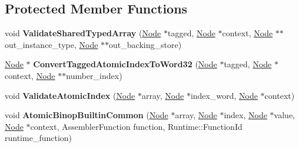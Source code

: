 \subsection*{Protected Member Functions}
\begin{DoxyCompactItemize}
\item 
\mbox{\label{classv8_1_1internal_1_1SharedArrayBufferBuiltinsAssembler_aafc61e258bff6133bca940758eb45acd}} 
void {\bfseries Validate\+Shared\+Typed\+Array} (\mbox{\hyperlink{classv8_1_1internal_1_1compiler_1_1Node}{Node}} $\ast$tagged, \mbox{\hyperlink{classv8_1_1internal_1_1compiler_1_1Node}{Node}} $\ast$context, \mbox{\hyperlink{classv8_1_1internal_1_1compiler_1_1Node}{Node}} $\ast$$\ast$out\+\_\+instance\+\_\+type, \mbox{\hyperlink{classv8_1_1internal_1_1compiler_1_1Node}{Node}} $\ast$$\ast$out\+\_\+backing\+\_\+store)
\item 
\mbox{\label{classv8_1_1internal_1_1SharedArrayBufferBuiltinsAssembler_ae9581b3c8b2318fbb11e60fb56eec50a}} 
\mbox{\hyperlink{classv8_1_1internal_1_1compiler_1_1Node}{Node}} $\ast$ {\bfseries Convert\+Tagged\+Atomic\+Index\+To\+Word32} (\mbox{\hyperlink{classv8_1_1internal_1_1compiler_1_1Node}{Node}} $\ast$tagged, \mbox{\hyperlink{classv8_1_1internal_1_1compiler_1_1Node}{Node}} $\ast$context, \mbox{\hyperlink{classv8_1_1internal_1_1compiler_1_1Node}{Node}} $\ast$$\ast$number\+\_\+index)
\item 
\mbox{\label{classv8_1_1internal_1_1SharedArrayBufferBuiltinsAssembler_aece102f5ae6d37be9742508007ee03c2}} 
void {\bfseries Validate\+Atomic\+Index} (\mbox{\hyperlink{classv8_1_1internal_1_1compiler_1_1Node}{Node}} $\ast$array, \mbox{\hyperlink{classv8_1_1internal_1_1compiler_1_1Node}{Node}} $\ast$index\+\_\+word, \mbox{\hyperlink{classv8_1_1internal_1_1compiler_1_1Node}{Node}} $\ast$context)
\item 
\mbox{\label{classv8_1_1internal_1_1SharedArrayBufferBuiltinsAssembler_a2df2f27f4d1afa997f0ab17ee3c615da}} 
void {\bfseries Atomic\+Binop\+Builtin\+Common} (\mbox{\hyperlink{classv8_1_1internal_1_1compiler_1_1Node}{Node}} $\ast$array, \mbox{\hyperlink{classv8_1_1internal_1_1compiler_1_1Node}{Node}} $\ast$index, \mbox{\hyperlink{classv8_1_1internal_1_1compiler_1_1Node}{Node}} $\ast$value, \mbox{\hyperlink{classv8_1_1internal_1_1compiler_1_1Node}{Node}} $\ast$context, Assembler\+Function function, Runtime\+::\+Function\+Id runtime\+\_\+function)
$$
\end{DoxyCompactItemize}

